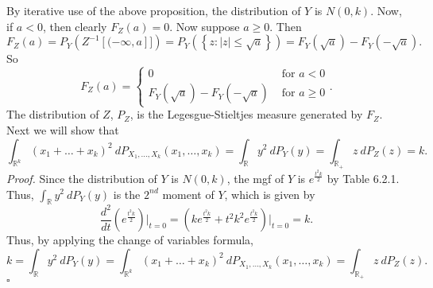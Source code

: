 \documentclass[12pt]{article}
\newcounter{ProofCounter}
\newenvironment{Proof}{\stepcounter{ProofCounter}\textit{Proof.}}{\hfill$\square$}
\begin{document}
\begin{enumerate}[label=(\alph*)]
By iterative use of the above proposition, the distribution of $Y$ is $N(0,k)$. Now, if $a < 0$, then clearly $F_{Z}(a) = 0$. Now suppose $a \geq 0$. Then 
\[ F_{Z}(a) = P_{Y}\left( Z^{-1}[(-\infty, a]] \right) = P_{Y}\left( \left\{ z : |z| \leq \sqrt{a} \right\} \right) = F_{Y}(\sqrt{a}) -
F_{Y}(-\sqrt{a}). \]
So 
\[ F_{Z}(a) = \left\{ \begin{array}{cl}
0 & \text{ for } a < 0 \\
F_{Y}(\sqrt{a}) - F_{Y}(-\sqrt{a}) & \text{ for } a \geq 0 
\end{array} \right. .\]
The distribution of $Z$, $P_{Z}$, is the Legesgue-Stieltjes measure generated by $F_{Z}$. Next we will show that 
\[ \int_{\mathbb{R}^{k}}(x_{1} + \dots + x_{k})^{2}\ dP_{X_{1}, \hdots, X_{k}}(x_{1}, \hdots, x_{k}) = \int_{\mathbb{R}}y^{2}\ dP_{Y}(y) =
\int_{\mathbb{R}_{+}}z \ dP_{Z}(z) = k.\]
\begin{Proof}
Since the distribution of $Y$ is $N(0,k)$, the mgf of $Y$ is $e^{\frac{t^{2}k}{2}}$ by Table 6.2.1. Thus, 
$\int_{\mathbb{R}}y^{2}\ dP_{Y}(y)$ is the $2^{nd}$ moment of $Y$, which is given by 
\[ \frac{d^{2}}{dt} \left( e^{\frac{t^{2}k}{2}}\right)\bigg|_{t=0} = \left( ke^{\frac{t^{2}k}{2}} + t^{2}k^{2}e^{\frac{t^{2}k}{2}} \right)\bigg|_{t=0} = k. \]
Thus, by applying the change of variables formula, 
\[ k = \int_{\mathbb{R}}y^{2}\ dP_{Y}(y) = \int_{\mathbb{R}^{k}}(x_{1} + \dots + x_{k})^{2}\ dP_{X_{1}, \hdots, X_{k}}(x_{1}, \hdots, x_{k}) = 
\int_{\mathbb{R}_{+}}z \ dP_{Z}(z).\]
\end{Proof}


\end{enumerate}
\end{document}
